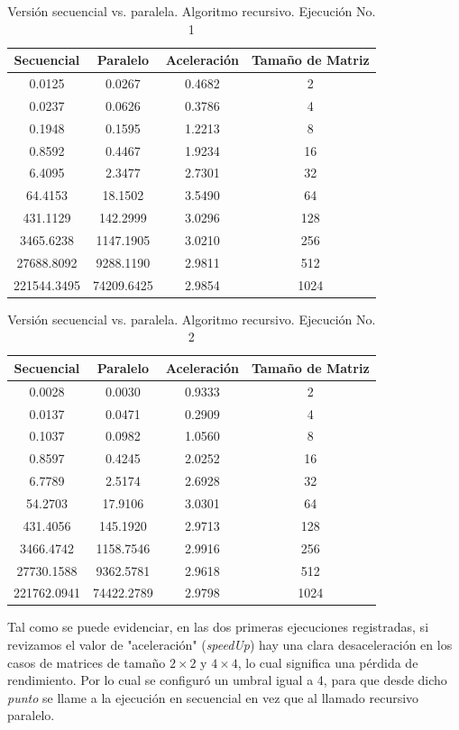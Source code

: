 \documentclass{article}
\begin{document}
\begin{table}[ht]
\centering
\begin{tabular}{|c|c|c|c|}
\hline
\textbf{Secuencial} & \textbf{Paralelo} & \textbf{Aceleración} & \textbf{Tamaño de Matriz} \\
\hline
0.0125 & 0.0267 & 0.4682 & 2 \\
0.0237 & 0.0626 & 0.3786 & 4 \\
0.1948 & 0.1595 & 1.2213 & 8 \\
0.8592 & 0.4467 & 1.9234 & 16 \\
6.4095 & 2.3477 & 2.7301 & 32 \\
64.4153 & 18.1502 & 3.5490 & 64 \\
431.1129 & 142.2999 & 3.0296 & 128 \\
3465.6238 & 1147.1905 & 3.0210 & 256 \\
27688.8092 & 9288.1190 & 2.9811 & 512 \\
221544.3495 & 74209.6425 & 2.9854 & 1024 \\
\hline
\end{tabular}
\caption{Versión secuencial vs. paralela. Algoritmo recursivo. Ejecución No. 1}
\end{table}

\begin{table}[ht]
\centering
\begin{tabular}{|c|c|c|c|}
\hline
\textbf{Secuencial} & \textbf{Paralelo} & \textbf{Aceleración} & \textbf{Tamaño de Matriz} \\
\hline
0.0028 & 0.0030 & 0.9333 & 2 \\
0.0137 & 0.0471 & 0.2909 & 4 \\
0.1037 & 0.0982 & 1.0560 & 8 \\
0.8597 & 0.4245 & 2.0252 & 16 \\
6.7789 & 2.5174 & 2.6928 & 32 \\
54.2703 & 17.9106 & 3.0301 & 64 \\
431.4056 & 145.1920 & 2.9713 & 128 \\
3466.4742 & 1158.7546 & 2.9916 & 256 \\
27730.1588 & 9362.5781 & 2.9618 & 512 \\
221762.0941 & 74422.2789 & 2.9798 & 1024 \\
\hline
\end{tabular}
\caption{Versión secuencial vs. paralela. Algoritmo recursivo. Ejecución No. 2}
\end{table}

Tal como se puede evidenciar, en las dos primeras ejecuciones registradas, si revizamos el valor de "aceleración" (\textit{speedUp}) hay una clara desaceleración en los casos de matrices de tamaño \(2 \times 2\) y \(4 \times 4\), lo cual significa una pérdida de rendimiento. Por lo cual se configuró un umbral igual a 4, para que desde dicho \textit{punto} se llame a la ejecución en secuencial en vez que al llamado recursivo paralelo.\\
\end{document}
